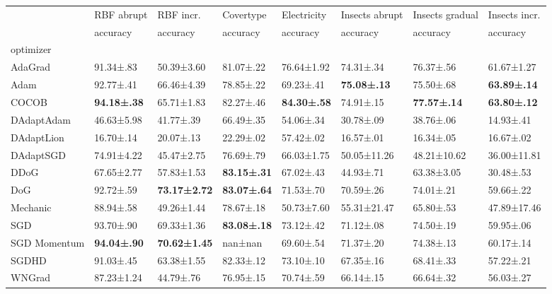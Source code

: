 \begin{tabular}{llllllll}
\toprule
 & RBF abrupt & RBF incr. & Covertype & Electricity & Insects abrupt & Insects gradual & Insects incr. \\
 & accuracy & accuracy & accuracy & accuracy & accuracy & accuracy & accuracy \\
optimizer &  &  &  &  &  &  &  \\
\midrule
AdaGrad & 91.34±.83 & 50.39±3.60 & 81.07±.22 & 76.64±1.92 & 74.31±.34 & 76.37±.56 & 61.67±1.27 \\
Adam & 92.77±.41 & 66.46±4.39 & 78.85±.22 & 69.23±.41 & \bfseries 75.08±.13 & 75.50±.68 & \bfseries 63.89±.14 \\
COCOB & \bfseries 94.18±.38 & 65.71±1.83 & 82.27±.46 & \bfseries 84.30±.58 & 74.91±.15 & \bfseries 77.57±.14 & \bfseries 63.80±.12 \\
DAdaptAdam & 46.63±5.98 & 41.77±.39 & 66.49±.35 & 54.06±.34 & 30.78±.09 & 38.76±.06 & 14.93±.41 \\
DAdaptLion & 16.70±.14 & 20.07±.13 & 22.29±.02 & 57.42±.02 & 16.57±.01 & 16.34±.05 & 16.67±.02 \\
DAdaptSGD & 74.91±4.22 & 45.47±2.75 & 76.69±.79 & 66.03±1.75 & 50.05±11.26 & 48.21±10.62 & 36.00±11.81 \\
DDoG & 67.65±2.77 & 57.83±1.53 & \bfseries 83.15±.31 & 67.02±.43 & 44.93±.71 & 63.38±3.05 & 30.48±.53 \\
DoG & 92.72±.59 & \bfseries 73.17±2.72 & \bfseries 83.07±.64 & 71.53±.70 & 70.59±.26 & 74.01±.21 & 59.66±.22 \\
Mechanic & 88.94±.58 & 49.26±1.44 & 78.67±.18 & 50.73±7.60 & 55.31±21.47 & 65.80±.53 & 47.89±17.46 \\
SGD & 93.70±.90 & 69.33±1.36 & \bfseries 83.08±.18 & 73.12±.42 & 71.12±.08 & 74.50±.19 & 59.95±.06 \\
SGD Momentum & \bfseries 94.04±.90 & \bfseries 70.62±1.45 & nan±nan & 69.60±.54 & 71.37±.20 & 74.38±.13 & 60.17±.14 \\
SGDHD & 91.03±.45 & 63.38±1.55 & 82.33±.12 & 73.10±.10 & 67.35±.16 & 68.41±.33 & 57.22±.21 \\
WNGrad & 87.23±1.24 & 44.79±.76 & 76.95±.15 & 70.74±.59 & 66.14±.15 & 66.64±.32 & 56.03±.27 \\
\bottomrule
\end{tabular}
